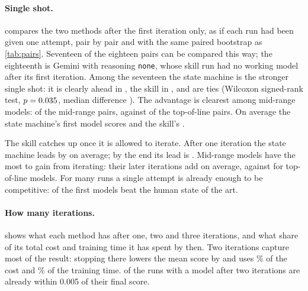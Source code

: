 \paragraph{Single shot.}  compares the two methods after the first iteration only, as if each run had
been given one attempt, pair by pair and with the same paired bootstrap as \cref{tab:pairs}. Seventeen of the eighteen pairs can be compared this way; the eighteenth is Gemini with reasoning \texttt{none},
whose skill run had no working model after its first iteration. Among the seventeen the state machine is the stronger
single shot: it is clearly ahead in \FirstCiSm{}, the skill in \FirstCiSkill{}, and \FirstCiTie{} are ties (Wilcoxon
signed-rank test, $p=0.035$, median difference \FirstMedianDiff). The advantage is clearest among mid-range models:
\FirstMidCiSm{} of the \FirstMidCiPairs{} mid-range pairs, against \FirstFlagCiSm{} of the \FirstFlagCiPairs{}
top-of-line pairs. On average the state machine's first model scores \FirstSmMean{} and the skill's \FirstSkillMean{}.

The skill catches up once it is allowed to iterate. After one iteration the state machine leads by \FirstGap{} on
average; by the end its lead is \FinalGap. Mid-range models have the most to gain from iterating: their later
iterations add \FirstSmallGain{} on average, against \FirstFlagGain{} for top-of-line models. For many runs a single
attempt is already enough to be competitive: \FirstAboveSota{} of the \FirstRuns{} first models beat the human state
of the art.

\begin{table}[tbp]\centering\small
\caption{Single-shot comparison: test AU-PRC of the model each run had after its first iteration. SM: state machine
(Agentomics-ML). $\Delta$: SM minus skill, with a 95\% paired bootstrap interval as in \cref{tab:pairs}; bold where the
interval excludes zero. N/A: no working model after the first iteration. $^{\dagger}$, $^{\ddagger}$: as in
\cref{tab:matrix}.}
\label{tab:single}
\FirstPairTable
\end{table}

\paragraph{How many iterations.}  shows what each method has after one, two and three iterations,
and what share of its total cost and training time it has spent by then. Two iterations capture most of the result:
stopping there lowers the mean score by \TwoLoss{} and uses \TwoCostShare\% of the cost and \TwoTimeShare\% of the
training time. \TwoWithin{} of the \TwoRuns{} runs with a model after two iterations are already within 0.005 of their
final score.

